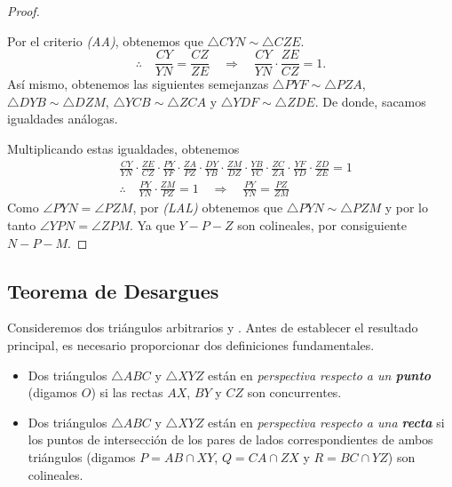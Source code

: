 \begin{proof}
    \begin{multicols}{2}
        \begin{figure}[H]
            \centering
            
        \end{figure}

        Por el criterio \textit{(AA)}, obtenemos que $\triangle CYN \sim \triangle CZE$.
        \[
            \therefore  \quad \frac{CY}{YN} = \frac{CZ}{ZE} \quad \Rightarrow \quad \frac{CY}{YN} \cdot \frac{ZE}{CZ} = 1.
        \]
        Así mismo, obtenemos las siguientes semejanzas $\triangle PYF \sim \triangle PZA$, $\triangle DYB \sim \triangle DZM$, $\triangle YCB \sim \triangle ZCA$ y $\triangle YDF \sim \triangle ZDE$.
        De donde, sacamos igualdades análogas.
    \end{multicols}

    Multiplicando estas igualdades, obtenemos
    \begin{align*}
        &\frac{CY}{YN} \cdot \frac{ZE}{CZ} \cdot \frac{PY}{YF} \cdot \frac{ZA}{PZ} \cdot \frac{DY}{YB} \cdot \frac{ZM}{DZ} \cdot \frac{YB}{YC} \cdot \frac{ZC}{ZA} \cdot \frac{YF}{YD} \cdot \frac{ZD}{ZE} = 1\\[3mm]
        &\therefore \quad \frac{PY}{YN} \cdot \frac{ZM}{PZ} = 1 \quad \Rightarrow \quad \frac{PY}{YN} = \frac{PZ}{ZM}
    \end{align*}
    Como $\angle PYN = \angle PZM$, por \textit{(LAL)} obtenemos que $\triangle PYN \sim \triangle PZM$ y por lo tanto $\angle YPN = \angle ZPM$.
    Ya que $Y - P - Z$ son colineales, por consiguiente $N - P - M$.
\end{proof}



\subsection{Teorema de Desargues}

Consideremos dos triángulos arbitrarios  y .
Antes de establecer el resultado principal, es necesario proporcionar dos definiciones fundamentales.

\begin{section-definition.tcb}{}{}
    \begin{itemize}
        \item Dos triángulos $\triangle ABC$ y $\triangle XYZ$ están en \textit{perspectiva respecto a un \textbf{punto}} (digamos $O$) si las rectas $AX$, $BY$ y $CZ$ son concurrentes.
        \item Dos triángulos $\triangle ABC$ y $\triangle XYZ$ están en \textit{perspectiva respecto a una \textbf{recta}} si los puntos de intersección de los pares de lados correspondientes de ambos triángulos (digamos $P = AB \cap XY$, $Q = CA \cap ZX$ y $R = BC \cap YZ$) son colineales.
    \end{itemize}
\end{section-definition.tcb}

